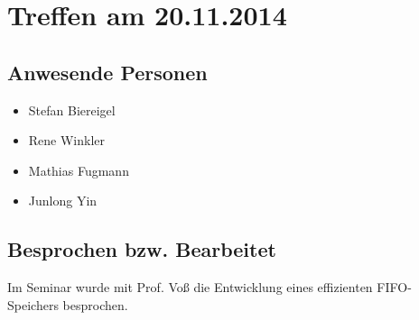 \chapter{Treffen am 20.11.2014}
\section{Anwesende Personen}
\begin{itemize}
	\item Stefan Biereigel
	\item Rene Winkler
	\item Mathias Fugmann
	\item Junlong Yin
\end{itemize}

\section{Besprochen bzw. Bearbeitet}
Im Seminar wurde mit Prof. Voß die Entwicklung eines effizienten FIFO-Speichers besprochen.